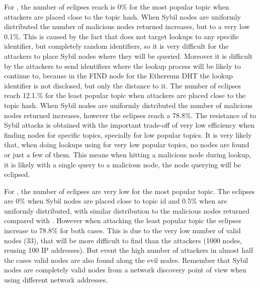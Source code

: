 For \discv,  the number of eclipses reach is 0\% for the most popular topic when attackers are placed close to the topic hash.  When Sybil nodes are uniformly distributed the number of malicious nodes returned increases,  but to a very low 0.1\%.
This is caused by the fact that \discv does not target lookups to any specific identifier,  but completely random identifiers,  so it is very difficult for the attackers to place Sybil nodes where they will be queried.  Moreover it is difficult by the attackers to send identifiers where the lookup process will be likely to continue to,  because in the FIND node for the Ethereum DHT the lookup identifier is not disclosed,  but only the distance to it.
The number of eclipses reach 12.1.\% for the least popular topic when attackers are placed close to the topic hash.  When Sybil nodes are uniformly distributed the number of malicious nodes returned increases,  however the eclipses  reach a 78.8\%.
The resistance of \discv to Sybil attacks is obtained with the important trade-off of very low efficiency when finding nodes for specific topics, specially for low popular topics.  It is very likely that, when doing lookups using \discv for very low popular topics, no nodes are found or just a few of them.   This means when hitting a malicious node during lookup,  it is likely with a single query to a malicious node, the node querying will be eclipsed.

For \sysname, the number of eclipses are very low for the most popular topic. 
The eclipses are 0\% when Sybil nodes are placed close to topic id and 0.5\% when are uniformly distributed, with similar distribution to the malicious nodes returned compared with \discv.
However when attacking the least popular topic the eclipses increase to 78.8\% for both cases.
This is due to the very low number of valid nodes (33),  that will be more difficult to find than the attackers (1000 nodes, reusing 100 IP addresses).  
But event the high number of attackers in almost half the cases valid nodes are also found along the evil nodes.
Remember that Sybil nodes are completely valid nodes from a network discovery point of view when using different network addresses.


